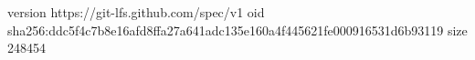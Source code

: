 version https://git-lfs.github.com/spec/v1
oid sha256:ddc5f4c7b8e16afd8ffa27a641adc135e160a4f445621fe000916531d6b93119
size 248454
